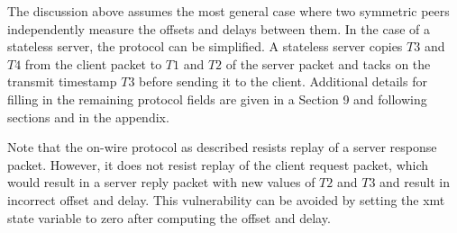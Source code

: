The discussion above assumes the most general case where two
symmetric peers independently measure the offsets and delays between
them. In the case of a stateless server, the protocol can be
simplified. A stateless server copies $ T3 $ and $ T4 $ from the client
packet to $ T1 $ and $ T2 $ of the server packet and tacks on the transmit
timestamp $ T3 $ before sending it to the client. Additional details for
filling in the remaining protocol fields are given in a Section 9 and
following sections and in the appendix.

Note that the on-wire protocol as described resists replay of a
server response packet. However, it does not resist replay of the
client request packet, which would result in a server reply packet
with new values of $ T2 $ and $ T3 $ and result in incorrect offset and
delay. This vulnerability can be avoided by setting the xmt state
variable to zero after computing the offset and delay.
